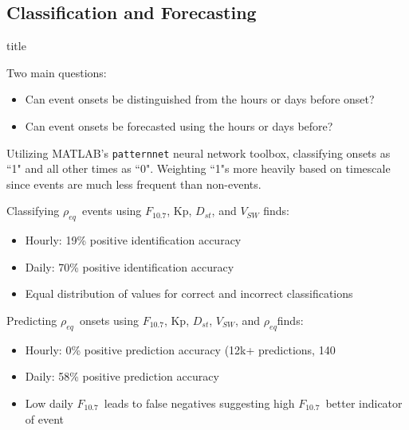 \documentclass[xcolor={dvipsnames,table}]{beamer}
\newcommand{\subheader}{    		\begin{center}
  	\begin{beamercolorbox}[sep=4pt,center,shadow=true,rounded=true]{title}
  		\usebeamerfont{title}\subsecname\par%
  	\end{beamercolorbox}
  	\vfill
  	\end{center}}
\newcommand{\req}{\ensuremath{\rho_{eq}}} %
\newcommand{\dst}{\ensuremath{D_{st}}} %
\newcommand{\f}{\ensuremath{F_{10.7}}} %
\begin{document}
\subsection{Classification and Forecasting}
\begin{frame}
	\subheader
	Two main questions:
	\begin{itemize}
		\item Can event onsets be distinguished from the hours or days before onset?
		\item Can event onsets be forecasted using the hours or days before?
	\end{itemize}
	\vspace{1em}
	Utilizing MATLAB's \texttt{patternnet} neural network toolbox, classifying onsets as ``1" and all other times as ``0". Weighting ``1"s more heavily based on timescale since events are much less frequent than non-events.
\end{frame}


\begin{frame}
	Classifying \req\ events using \f, Kp, \dst, and $V_{SW}$ finds:
	\begin{itemize}
		\item Hourly: 19\% positive identification accuracy\\
		\item Daily: 70\% positive identification accuracy\\
		\item Equal distribution of values for correct and incorrect classifications
	\end{itemize}
\end{frame}

\begin{frame}
	Predicting \req\ onsets using \f, Kp, \dst, $V_{SW}$, and \req finds:
	\begin{itemize}
		\item Hourly: 0\% positive prediction accuracy (12k+ predictions, 140 \\
		\item Daily: 58\% positive prediction accuracy\\
		\item Low daily \f\ leads to false negatives suggesting high \f\ better indicator of event
	\end{itemize}
\end{frame}



\end{document}

